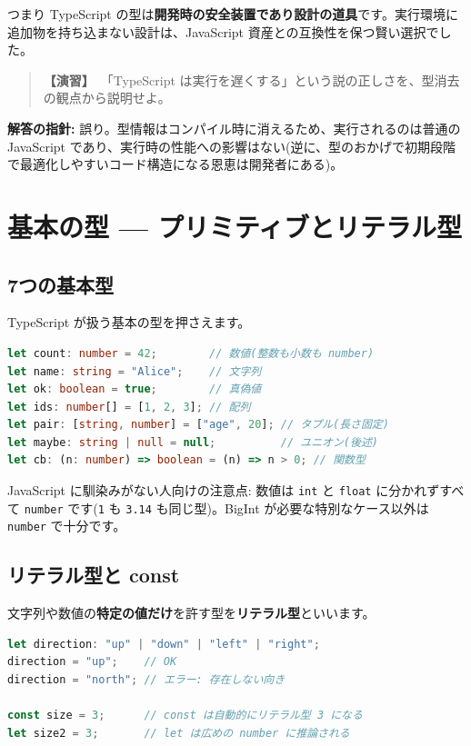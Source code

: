 \documentclass{article}
\begin{document}
つまり TypeScript の型は\textbf{開発時の安全装置であり設計の道具}です。実行環境に追加物を持ち込まない設計は、JavaScript 資産との互換性を保つ賢い選択でした。

\begin{quote}
\textbf{【演習】}\ 「TypeScript は実行を遅くする」という説の正しさを、型消去の観点から説明せよ。
\end{quote}

\textbf{解答の指針:} 誤り。型情報はコンパイル時に消えるため、実行されるのは普通の JavaScript であり、実行時の性能への影響はない(逆に、型のおかげで初期段階で最適化しやすいコード構造になる恩恵は開発者にある)。

\section{基本の型 — プリミティブとリテラル型}

\subsection{7つの基本型}

TypeScript が扱う基本の型を押さえます。

\begin{lstlisting}[language=TypeScript]
let count: number = 42;        // 数値(整数も小数も number)
let name: string = "Alice";    // 文字列
let ok: boolean = true;        // 真偽値
let ids: number[] = [1, 2, 3]; // 配列
let pair: [string, number] = ["age", 20]; // タプル(長さ固定)
let maybe: string | null = null;          // ユニオン(後述)
let cb: (n: number) => boolean = (n) => n > 0; // 関数型
\end{lstlisting}

JavaScript に馴染みがない人向けの注意点: 数値は \texttt{int} と \texttt{float} に分かれずすべて \texttt{number} です(\texttt{1} も \texttt{3.14} も同じ型)。BigInt が必要な特別なケース以外は \texttt{number} で十分です。

\subsection{リテラル型と const}

文字列や数値の\textbf{特定の値だけ}を許す型を\textbf{リテラル型}といいます。

\begin{lstlisting}[language=TypeScript]
let direction: "up" | "down" | "left" | "right";
direction = "up";    // OK
direction = "north"; // エラー: 存在しない向き

const size = 3;      // const は自動的にリテラル型 3 になる
let size2 = 3;       // let は広めの number に推論される
\end{lstlisting}
\end{document}
